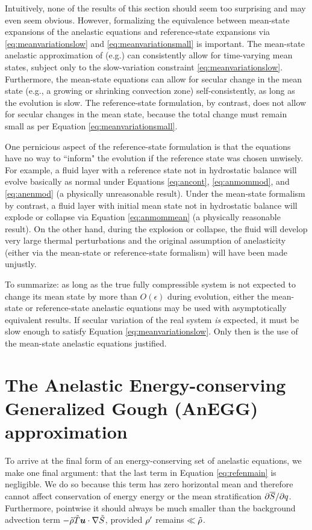 \documentclass[12pt]{article}
\begin{document}
Intuitively, none of the results of this section should seem too surprising and may even seem obvious. However, formalizing the equivalence between mean-state expansions of the anelastic equations and reference-state expansions via \eqref{eq:meanvariationslow} and \eqref{eq:meanvariationsmall} is important. The mean-state anelastic approximation of (e.g.) \citet{Gough1969} can consistently allow for time-varying mean states, subject only to the slow-variation constraint \eqref{eq:meanvariationslow}. Furthermore, the mean-state equations can allow for secular change in the mean state (e.g., a growing or shrinking convection zone) self-consistently, as long as the evolution is slow. The reference-state formulation, by contrast, does not allow for secular changes in the mean state, because the total change must remain small as per Equation \eqref{eq:meanvariationsmall}.

One pernicious aspect of the reference-state formulation is that the equations have no way to ``inform" the evolution if the reference state was chosen unwisely. For example, a fluid layer with a reference state not in hydrostatic balance will evolve basically as normal under Equations \eqref{eq:ancont}, \eqref{eq:anmommod}, and \eqref{eq:anenmod} (a physically unreasonable result). Under the mean-state formalism by contrast, a fluid layer with initial mean state not in hydrostatic balance will explode or collapse via Equation \eqref{eq:anmommean} (a physically reasonable result). On the other hand, during the explosion or collapse, the fluid will develop very large thermal perturbations and the original assumption of anelasticity (either via the mean-state or reference-state formalism) will have been made unjustly. 

To summarize: as long as the true fully compressible system is not expected to change its mean state by more than $O(\epsilon)$ during evolution, either the mean-state or reference-state anelastic equations may be used with asymptotically equivalent results. If secular variation of the real system \textit{is} expected, it must be slow enough to satisfy Equation \eqref{eq:meanvariationslow}. Only then is the use of the mean-state anelastic equations justified.

\section{The Anelastic Energy-conserving Generalized Gough (AnEGG) approximation}
To arrive at the final form of an energy-conserving set of anelastic equations, we make one final argument: that the last term in Equation \eqref{eq:refenmain} is negligible. We do so because this term has zero horizontal mean and therefore cannot affect conservation of energy energy or the mean stratification $\partial\overline{S}/\partial q$. Furthermore, pointwise it should always be much smaller than the background advection term $-\tilde{\rho}\tilde{T}\bm{u}\cdot\nabla\tilde{S}$, provided ${\rho^\prime}$ remains $\ll \tilde{\rho}$. 
\end{document}

